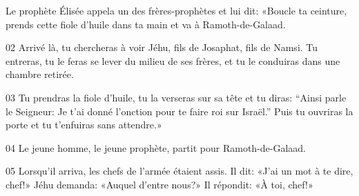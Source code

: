 Le prophète Élisée appela un des frères-prophètes et lui dit: «Boucle ta ceinture, prends cette fiole d’huile dans ta main et va à Ramoth-de-Galaad.

02 Arrivé là, tu chercheras à voir Jéhu, fils de Josaphat, fils de Namsi. Tu entreras, tu le feras se lever du milieu de ses frères, et tu le conduiras dans une chambre retirée.

03 Tu prendras la fiole d’huile, tu la verseras sur sa tête et tu diras: “Ainsi parle le Seigneur: Je t’ai donné l’onction pour te faire roi sur Israël.” Puis tu ouvriras la porte et tu t’enfuiras sans attendre.»

04 Le jeune homme, le jeune prophète, partit pour Ramoth-de-Galaad.

05 Lorsqu’il arriva, les chefs de l’armée étaient assis. Il dit: «J’ai un mot à te dire, chef!» Jéhu demanda: «Auquel d’entre nous?» Il répondit: «À toi, chef!»
